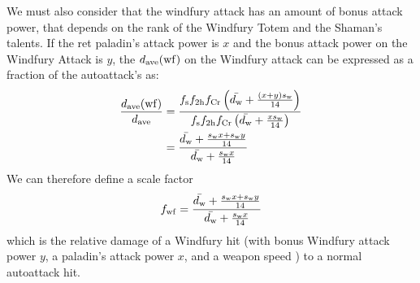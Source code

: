 We must also consider that the windfury attack has an amount of bonus attack power, that depends on the rank of the Windfury Totem and the Shaman's talents.
If the ret paladin's attack power is $x$ and the bonus attack power on the Windfury Attack is $y$, the $d_{\mathrm{ave}} (\mathrm{wf})$ on the Windfury attack can be expressed as a fraction of the autoattack's \dave as:
\begin{equation*}
	\begin{aligned}
		\frac{d_{\mathrm{ave}} (\mathrm{wf})}{d_{\mathrm{ave}} } &= \frac{f_{\mathrm{s}}  f_{\mathrm{2h}}  f_{\mathrm{Cr}}  \left( \bar{d_\mathrm{w}}  + \frac{(x+y)s_\mathrm{w} }{14} \right)}{f_{\mathrm{s}}  f_{\mathrm{2h}}  f_{\mathrm{Cr}}  \left( \bar{d_\mathrm{w} } + \frac{xs_\mathrm{w} }{14} \right)} \\
		&= \frac{\bar{d_\mathrm{w}}  + \frac{s_\mathrm{w}  x + s_\mathrm{w}  y}{14}}{\bar{d_\mathrm{w}}  + \frac{s_\mathrm{w}  x}{14}}
	\end{aligned}
\end{equation*}
We can therefore define a scale factor
\begin{equation}
	f_{\mathrm{wf}}  = \frac{\bar{d_\mathrm{w}}  + \frac{s_\mathrm{w}  x + s_\mathrm{w}  y}{14}}{\bar{d_\mathrm{w}}  + \frac{s_\mathrm{w}  x}{14}}
\end{equation}
which is the relative damage of a Windfury hit (with bonus Windfury attack power $y$, a paladin's attack power $x$, and a weapon speed \ws) to a normal autoattack hit.

